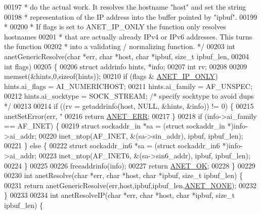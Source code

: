 \begin{DoxyCode}
{{{{{{{{{{00197 \textcolor{comment}{ * do the actual work. It resolves the hostname "host" and set the string}
00198 \textcolor{comment}{ * representation of the IP address into the buffer pointed by "ipbuf".}
00199 \textcolor{comment}{ *}
00200 \textcolor{comment}{ * If flags is set to ANET\_IP\_ONLY the function only resolves hostnames}
00201 \textcolor{comment}{ * that are actually already IPv4 or IPv6 addresses. This turns the function}
00202 \textcolor{comment}{ * into a validating / normalizing function. */}
00203 \textcolor{keywordtype}{int} anetGenericResolve(\textcolor{keywordtype}{char} *err, \textcolor{keywordtype}{char} *host, \textcolor{keywordtype}{char} *ipbuf, size\_t ipbuf\_len,
00204                        \textcolor{keywordtype}{int} flags)
00205 \{
00206     \textcolor{keyword}{struct} addrinfo hints, *info;
00207     \textcolor{keywordtype}{int} rv;
00208 
00209     memset(&hints,0,\textcolor{keyword}{sizeof}(hints));
00210     \textcolor{keywordflow}{if} (flags & \hyperlink{anet_8h_a705c91a7b61459ba004364262845c5f4}{ANET\_IP\_ONLY}) hints.ai\_flags = AI\_NUMERICHOST;
00211     hints.ai\_family = AF\_UNSPEC;
00212     hints.ai\_socktype = SOCK\_STREAM;  \textcolor{comment}{/* specify socktype to avoid dups */}
00213 
00214     \textcolor{keywordflow}{if} ((rv = getaddrinfo(host, NULL, &hints, &info)) != 0) \{
00215         anetSetError(err, \textcolor{stringliteral}{"%
00216         \textcolor{keywordflow}{return} \hyperlink{anet_8h_a0697b7774a7e0f4ef141839fe93536fe}{ANET\_ERR};
00217     \}
00218     \textcolor{keywordflow}{if} (info->ai\_family == AF\_INET) \{
00219         \textcolor{keyword}{struct} sockaddr\_in *sa = (\textcolor{keyword}{struct} sockaddr\_in *)info->ai\_addr;
00220         inet\_ntop(AF\_INET, &(sa->sin\_addr), ipbuf, ipbuf\_len);
00221     \} \textcolor{keywordflow}{else} \{
00222         \textcolor{keyword}{struct} sockaddr\_in6 *sa = (\textcolor{keyword}{struct} sockaddr\_in6 *)info->ai\_addr;
00223         inet\_ntop(AF\_INET6, &(sa->sin6\_addr), ipbuf, ipbuf\_len);
00224     \}
00225 
00226     freeaddrinfo(info);
00227     \textcolor{keywordflow}{return} \hyperlink{anet_8h_a25fb91ccc6457153f6d2e21380d4c6cf}{ANET\_OK};
00228 \}
00229 
00230 \textcolor{keywordtype}{int} anetResolve(\textcolor{keywordtype}{char} *err, \textcolor{keywordtype}{char} *host, \textcolor{keywordtype}{char} *ipbuf, size\_t ipbuf\_len) \{
00231     \textcolor{keywordflow}{return} anetGenericResolve(err,host,ipbuf,ipbuf\_len,\hyperlink{anet_8h_aea959562fbeec73b16b1cc037e700c02}{ANET\_NONE});
00232 \}
00233 
00234 \textcolor{keywordtype}{int} anetResolveIP(\textcolor{keywordtype}{char} *err, \textcolor{keywordtype}{char} *host, \textcolor{keywordtype}{char} *ipbuf, size\_t ipbuf\_len) \{
}}}}}}}}}}}
\end{DoxyCode}
